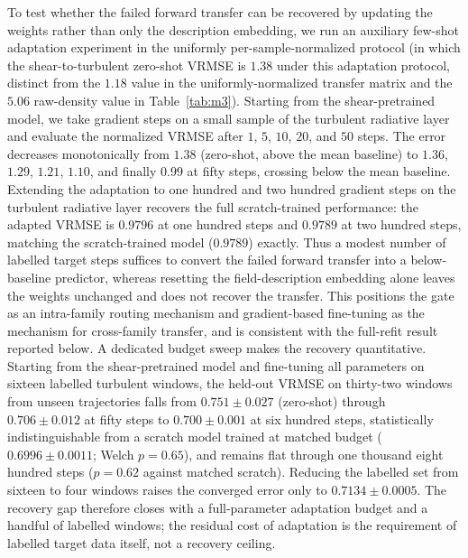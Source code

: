 \documentclass[preprint,12pt]{elsarticle}
\begin{document}
To test whether the failed forward transfer can be recovered by updating the weights rather than only the description embedding, we run an auxiliary few-shot adaptation experiment in the uniformly per-sample-normalized protocol (in which the shear-to-turbulent zero-shot VRMSE is $1.38$ under this adaptation protocol, distinct from the $1.18$ value in the uniformly-normalized transfer matrix and the $5.06$ raw-density value in Table~\ref{tab:m3}). Starting from the shear-pretrained model, we take gradient steps on a small sample of the turbulent radiative layer and evaluate the normalized VRMSE after $1$, $5$, $10$, $20$, and $50$ steps. The error decreases monotonically from $1.38$ (zero-shot, above the mean baseline) to $1.36$, $1.29$, $1.21$, $1.10$, and finally $0.99$ at fifty steps, crossing below the mean baseline. Extending the adaptation to one hundred and two hundred gradient steps on the turbulent radiative layer recovers the full scratch-trained performance: the adapted VRMSE is $0.9796$ at one hundred steps and $0.9789$ at two hundred steps, matching the scratch-trained model ($0.9789$) exactly. Thus a modest number of labelled target steps suffices to convert the failed forward transfer into a below-baseline predictor, whereas resetting the field-description embedding alone leaves the weights unchanged and does not recover the transfer. This positions the gate as an intra-family routing mechanism and gradient-based fine-tuning as the mechanism for cross-family transfer, and is consistent with the full-refit result reported below. A dedicated budget sweep makes the recovery quantitative. Starting from the shear-pretrained model and fine-tuning all parameters on sixteen labelled turbulent windows, the held-out VRMSE on thirty-two windows from unseen trajectories falls from $0.751\pm0.027$ (zero-shot) through $0.706\pm0.012$ at fifty steps to $0.700\pm0.001$ at six hundred steps, statistically indistinguishable from a scratch model trained at matched budget ($0.6996\pm0.0011$; Welch $p=0.65$), and remains flat through one thousand eight hundred steps ($p=0.62$ against matched scratch). Reducing the labelled set from sixteen to four windows raises the converged error only to $0.7134\pm0.0005$. The recovery gap therefore closes with a full-parameter adaptation budget and a handful of labelled windows; the residual cost of adaptation is the requirement of labelled target data itself, not a recovery ceiling.
\end{document}
